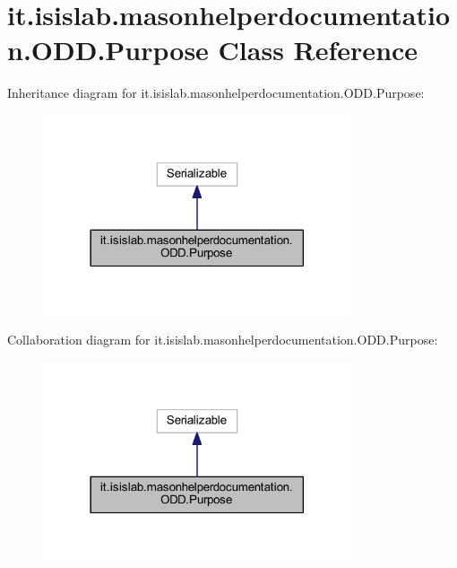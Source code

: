 \hypertarget{classit_1_1isislab_1_1masonhelperdocumentation_1_1_o_d_d_1_1_purpose}{\section{it.\-isislab.\-masonhelperdocumentation.\-O\-D\-D.\-Purpose Class Reference}
\label{classit_1_1isislab_1_1masonhelperdocumentation_1_1_o_d_d_1_1_purpose}
}


Inheritance diagram for it.\-isislab.\-masonhelperdocumentation.\-O\-D\-D.\-Purpose\-:\nopagebreak
\begin{figure}[H]
\begin{center}
\leavevmode
\includegraphics[width=258pt]{classit_1_1isislab_1_1masonhelperdocumentation_1_1_o_d_d_1_1_purpose__inherit__graph}
\end{center}
\end{figure}


Collaboration diagram for it.\-isislab.\-masonhelperdocumentation.\-O\-D\-D.\-Purpose\-:\nopagebreak
\begin{figure}[H]
\begin{center}
\leavevmode
\includegraphics[width=258pt]{classit_1_1isislab_1_1masonhelperdocumentation_1_1_o_d_d_1_1_purpose__coll__graph}
\end{center}
\end{figure}
